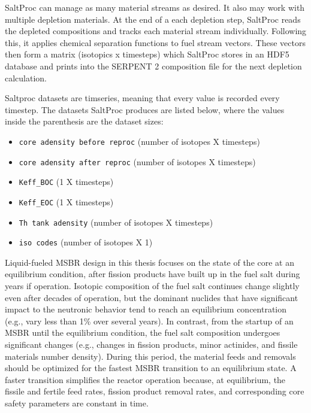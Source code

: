 SaltProc can manage as many material streams as desired. It also may work with multiple depletion 
materials. At the end of a each depletion
step, SaltProc reads the depleted compositions and tracks each material stream individually. 
Following this, it applies chemical
separation functions to fuel stream vectors. These vectors then form a matrix (isotopics x 
timesteps) which SaltProc stores in an HDF5 database
and prints into the SERPENT 2 composition file for the next depletion calculation.

Saltproc datasets are timseries, meaning that every value is recorded every timestep. The 
datasets SaltProc produces are listed below,
where the values inside the parenthesis are the dataset sizes:

\begin{itemize}
    \item \texttt{core adensity before reproc} (number of isotopes X timesteps)
    \item \texttt{core adensity after reproc} (number of isotopes X timesteps)
    \item \texttt{Keff_BOC} (1 X timesteps)
    \item \texttt{Keff_EOC} (1 X timesteps)
    \item \texttt{Th tank adensity} (number of isotopes X timesteps)
    \item \texttt{iso codes} (number of isotopes X 1)
\end{itemize}

Liquid-fueled \gls{MSBR} design in this thesis focuses on the state of the core at an equilibrium condition, after fission products have
built up in the fuel salt during years if operation. Isotopic composition of the fuel salt continues change slightly even after decades
of operation, but the dominant nuclides that have significant impact to the neutronic behavior tend to reach an equilibrium concentration
(e.g., vary less than 1\% over several years). In contrast, from the startup of an \gls{MSBR} until the equilibrium condition,
the fuel salt composition undergoes significant changes (e.g., changes in fission products, minor actinides, and fissile
materials number density). During this period, the material feeds and removals should be optimized for the fastest \gls{MSBR} transition to an
equilibrium state. A faster transition simplifies the reactor operation because, at equilibrium, the fissile and fertile feed rates,
fission product removal rates, and corresponding core safety parameters are constant in time.

